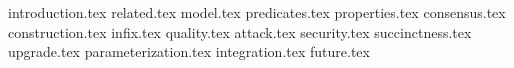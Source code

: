 {introduction.tex}
{related.tex}
{model.tex}
{predicates.tex}
{properties.tex}
{consensus.tex}
{construction.tex}
{infix.tex}
{quality.tex}
{attack.tex}
{security.tex}
{succinctness.tex}
{upgrade.tex}
{parameterization.tex}
{integration.tex}
{future.tex}
